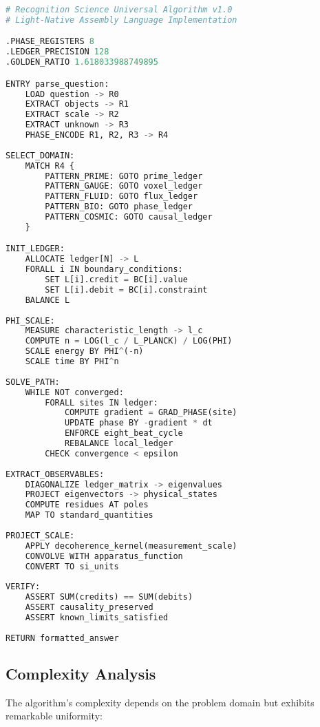 \documentclass[12pt,a4paper]{article}
\begin{document}
\begin{lstlisting}[language=Python, caption=RS Universal Algorithm in LNAL]
# Recognition Science Universal Algorithm v1.0
# Light-Native Assembly Language Implementation

.PHASE_REGISTERS 8
.LEDGER_PRECISION 128
.GOLDEN_RATIO 1.618033988749895

ENTRY parse_question:
    LOAD question -> R0
    EXTRACT objects -> R1
    EXTRACT scale -> R2  
    EXTRACT unknown -> R3
    PHASE_ENCODE R1, R2, R3 -> R4
    
SELECT_DOMAIN:
    MATCH R4 {
        PATTERN_PRIME: GOTO prime_ledger
        PATTERN_GAUGE: GOTO voxel_ledger
        PATTERN_FLUID: GOTO flux_ledger
        PATTERN_BIO: GOTO phase_ledger
        PATTERN_COSMIC: GOTO causal_ledger
    }

INIT_LEDGER:
    ALLOCATE ledger[N] -> L
    FORALL i IN boundary_conditions:
        SET L[i].credit = BC[i].value
        SET L[i].debit = BC[i].constraint
    BALANCE L
    
PHI_SCALE:
    MEASURE characteristic_length -> l_c
    COMPUTE n = LOG(l_c / L_PLANCK) / LOG(PHI)
    SCALE energy BY PHI^(-n)
    SCALE time BY PHI^n
    
SOLVE_PATH:
    WHILE NOT converged:
        FORALL sites IN ledger:
            COMPUTE gradient = GRAD_PHASE(site)
            UPDATE phase BY -gradient * dt
            ENFORCE eight_beat_cycle
            REBALANCE local_ledger
        CHECK convergence < epsilon
        
EXTRACT_OBSERVABLES:
    DIAGONALIZE ledger_matrix -> eigenvalues
    PROJECT eigenvectors -> physical_states
    COMPUTE residues AT poles
    MAP TO standard_quantities
    
PROJECT_SCALE:
    APPLY decoherence_kernel(measurement_scale)
    CONVOLVE WITH apparatus_function
    CONVERT TO si_units
    
VERIFY:
    ASSERT SUM(credits) == SUM(debits)
    ASSERT causality_preserved
    ASSERT known_limits_satisfied
    
RETURN formatted_answer
\end{lstlisting}

\subsection{Complexity Analysis}

The algorithm's complexity depends on the problem domain but exhibits remarkable uniformity:
\end{document}
